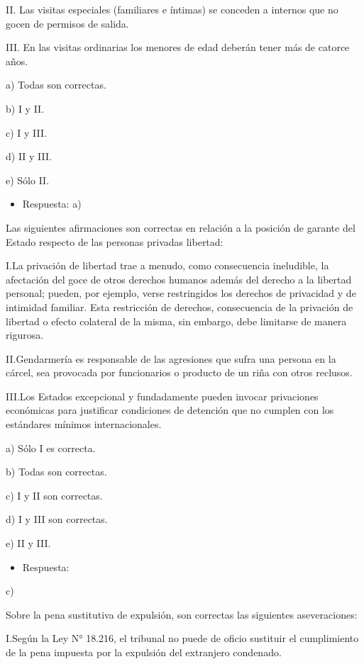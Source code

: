 \documentclass[letterpaper, 11pt]{article}
\begin{document}
II. Las visitas especiales (familiares e íntimas) se conceden a internos que no gocen de
permisos de salida.

III. En las visitas ordinarias los menores de edad deberán tener más de catorce años.

a) Todas son correctas.

b) I y II.

c) I y III.

d) II y III.

e) Sólo II.

\begin{itemize}
\item Respuesta:
a)
\end{itemize}



Las siguientes afirmaciones son correctas en relación a la posición de garante del
Estado respecto de las personas privadas libertad:

I.La privación de libertad trae a menudo, como consecuencia ineludible, la
afectación del goce de otros derechos humanos además del derecho a la libertad
personal; pueden, por ejemplo, verse restringidos los derechos de privacidad y de
intimidad familiar. Esta restricción de derechos, consecuencia de la privación de
libertad o efecto colateral de la misma, sin embargo, debe limitarse de manera
rigurosa.

II.Gendarmería es responsable de las agresiones que sufra una persona en la cárcel,
sea provocada por funcionarios o producto de un riña con otros reclusos.

III.Los Estados excepcional y fundadamente pueden invocar privaciones económicas
para justificar condiciones de detención que no cumplen con los estándares
mínimos internacionales.

a) Sólo I es correcta.

b) Todas son correctas.

c) I y II son correctas.

d) I y III son correctas.

e) II y III.

\begin{itemize}
\item Respuesta:
\end{itemize}
c)


Sobre la pena sustitutiva de expulsión, son correctas las siguientes aseveraciones:

I.Según la Ley N° 18.216, el tribunal no puede de oficio sustituir el cumplimiento de
la pena impuesta por la expulsión del extranjero condenado.
\end{document}
